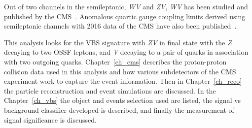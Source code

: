 Out of two channels in the semileptonic, \textit{WV} and \textit{ZV},
\textit{WV} has been studied and published by the \gls{CMS}~\cite{vbs-wv-cms-2021}.
Anomalous quartic gauge coupling limits derived using semileptonic
channels with 2016 data of the \gls{CMS} have also been published~\cite{wv-vbs-aqgc}.

This analysis looks for the \gls{VBS} signature with \textit{ZV} in final state
with the \textit{Z} decaying to two \gls{OSSF} leptons, and \textit{V} decaying to a pair
of quarks in association with two outgoing quarks. Chapter~\ref{ch_cms}
describes the proton-proton collision data used in this analysis and how
various subdetectors of the \gls{CMS} experiment work to capture the
event information. Then in Chapter~\ref{ch_reco} the particle
reconstruction and event simulations are discussed. In the
Chapter~\ref{ch_vbs} the object and events selection
used are listed, the signal vs background classifier developed
is described, and finally the measurement of signal significance is discussed.

